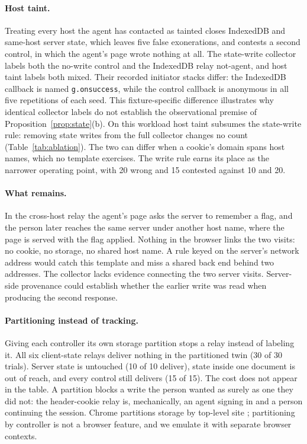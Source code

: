 \documentclass[11pt]{article}
\theoremstyle{definition}
\begin{document}
\paragraph{Host taint.} Treating every host the agent has contacted as tainted
closes IndexedDB and same-host server state, which leaves five false
exonerations, and contests a second control, in which the agent's page wrote
nothing at all. The state-write collector labels both the no-write control and the
IndexedDB relay not-agent, and host taint labels both mixed. Their recorded initiator
stacks differ: the IndexedDB callback is named \texttt{g.onsuccess}, while the control
callback is anonymous in all five repetitions of each seed. This fixture-specific
difference illustrates why identical collector labels do not establish the observational
premise of Proposition~\ref{prop:state}(b). On this workload host taint subsumes the
state-write rule: removing state
writes from the full collector changes no count (Table~\ref{tab:ablation}). The
two can differ when a cookie's domain spans host names, which no template
exercises. The write rule earns its place as the narrower operating point, with
20 wrong and 15 contested against 10 and 20.

\paragraph{What remains.} In the cross-host relay the agent's page asks the server
to remember a flag, and the person later reaches the same server under another
host name, where the page is served with the flag applied. Nothing in the
browser links the two visits: no cookie, no storage, no shared host name. A rule
keyed on the server's network address would catch this template and miss a
shared back end behind two addresses. The collector lacks evidence connecting the two
server visits. Server-side provenance could establish whether the earlier write was read
when producing the second response.

\paragraph{Partitioning instead of tracking.} Giving each controller its own storage
partition stops a relay instead of labeling it. All six client-state relays
deliver nothing in the partitioned twin (30 of 30 trials). Server state is
untouched (10 of 10 deliver), state inside one document is out of reach, and
every control still delivers (15 of 15). The cost does not appear in the table. A
partition blocks a write the person wanted as surely as one they did not: the
header-cookie relay is, mechanically, an agent signing in and a person continuing
the session. Chrome partitions storage by top-level site
\cite{storagepartitioning}; partitioning by controller is not a browser feature,
and we emulate it with separate browser contexts.
\end{document}
